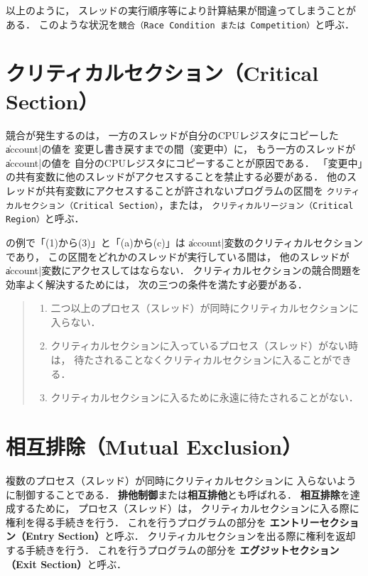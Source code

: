 以上のように，
スレッドの実行順序等により計算結果が間違ってしまうことがある．
このような状況を{\tt 競合（Race Condition または Competition）}と呼ぶ．

\section{クリティカルセクション（Critical Section）}
\label{criticalsection}
競合が発生するのは，
一方のスレッドが自分のCPUレジスタにコピーした\|account|の値を
変更し書き戻すまでの間（変更中）に，
もう一方のスレッドが\|account|の値を
自分のCPUレジスタにコピーすることが原因である．
「変更中」の共有変数に他のスレッドがアクセスすることを禁止する必要がある．
他のスレッドが共有変数にアクセスすることが許されないプログラムの区間を
{\tt クリティカルセクション（Critical Section）}，または，
{\tt クリティカルリージョン（Critical Region）}と呼ぶ．

の例で「(1)から(3)」と「(a)から(c)」は
\|account|変数のクリティカルセクションであり，
この区間をどれかのスレッドが実行している間は，
他のスレッドが\|account|変数にアクセスしてはならない．
クリティカルセクションの競合問題を効率よく解決するためには，
次の三つの条件を満たす必要がある．

\begin{quote}
\begin{enumerate}
\item 二つ以上のプロセス（スレッド）が同時にクリティカルセクションに入らない．
\item クリティカルセクションに入っているプロセス（スレッド）がない時は，
待たされることなくクリティカルセクションに入ることができる．
\item クリティカルセクションに入るために永遠に待たされることがない．
\end{enumerate}
\end{quote}

\section{相互排除（Mutual Exclusion）}
複数のプロセス（スレッド）が同時にクリティカルセクションに
入らないように制御することである．
{\bf 排他制御}または{\bf 相互排他}とも呼ばれる．
{\bf 相互排除}を達成するために，
プロセス（スレッド）は，
クリティカルセクションに入る際に権利を得る手続きを行う．
これを行うプログラムの部分を
{\bf エントリーセクション（Entry Section）}と呼ぶ．
クリティカルセクションを出る際に権利を返却する手続きを行う．
これを行うプログラムの部分を
{\bf エグジットセクション（Exit Section）}と呼ぶ．

